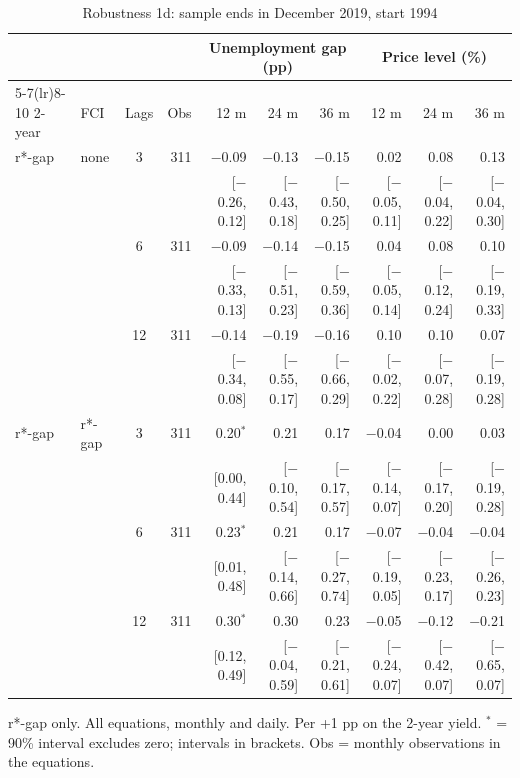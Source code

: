 \begin{table}[p]\centering\footnotesize\setlength{\tabcolsep}{2.2pt}
\caption{Robustness 1d: sample ends in December 2019, start 1994}\label{tab:R1d}
\begin{tabular}{llcrrrrrrr}\toprule
 & & & & \multicolumn{3}{c}{Unemployment gap (pp)} & \multicolumn{3}{c}{Price level (\%)}\\ \cmidrule(lr){5-7}\cmidrule(lr){8-10}
2-year & FCI & Lags & Obs & 12 m & 24 m & 36 m & 12 m & 24 m & 36 m\\ \midrule
r*-gap & none & 3 & 311 & $-$0.09 & $-$0.13 & $-$0.15 & 0.02 & 0.08 & 0.13\\
 & & & & {\scriptsize [$-$0.26, 0.12]} & {\scriptsize [$-$0.43, 0.18]} & {\scriptsize [$-$0.50, 0.25]} & {\scriptsize [$-$0.05, 0.11]} & {\scriptsize [$-$0.04, 0.22]} & {\scriptsize [$-$0.04, 0.30]}\\
 &  & 6 & 311 & $-$0.09 & $-$0.14 & $-$0.15 & 0.04 & 0.08 & 0.10\\
 & & & & {\scriptsize [$-$0.33, 0.13]} & {\scriptsize [$-$0.51, 0.23]} & {\scriptsize [$-$0.59, 0.36]} & {\scriptsize [$-$0.05, 0.14]} & {\scriptsize [$-$0.12, 0.24]} & {\scriptsize [$-$0.19, 0.33]}\\
 &  & 12 & 311 & $-$0.14 & $-$0.19 & $-$0.16 & 0.10 & 0.10 & 0.07\\
 & & & & {\scriptsize [$-$0.34, 0.08]} & {\scriptsize [$-$0.55, 0.17]} & {\scriptsize [$-$0.66, 0.29]} & {\scriptsize [$-$0.02, 0.22]} & {\scriptsize [$-$0.07, 0.28]} & {\scriptsize [$-$0.19, 0.28]}\\
r*-gap & r*-gap & 3 & 311 & 0.20$^{*}$ & 0.21 & 0.17 & $-$0.04 & 0.00 & 0.03\\
 & & & & {\scriptsize [0.00, 0.44]} & {\scriptsize [$-$0.10, 0.54]} & {\scriptsize [$-$0.17, 0.57]} & {\scriptsize [$-$0.14, 0.07]} & {\scriptsize [$-$0.17, 0.20]} & {\scriptsize [$-$0.19, 0.28]}\\
 &  & 6 & 311 & 0.23$^{*}$ & 0.21 & 0.17 & $-$0.07 & $-$0.04 & $-$0.04\\
 & & & & {\scriptsize [0.01, 0.48]} & {\scriptsize [$-$0.14, 0.66]} & {\scriptsize [$-$0.27, 0.74]} & {\scriptsize [$-$0.19, 0.05]} & {\scriptsize [$-$0.23, 0.17]} & {\scriptsize [$-$0.26, 0.23]}\\
 &  & 12 & 311 & 0.30$^{*}$ & 0.30 & 0.23 & $-$0.05 & $-$0.12 & $-$0.21\\
 & & & & {\scriptsize [0.12, 0.49]} & {\scriptsize [$-$0.04, 0.59]} & {\scriptsize [$-$0.21, 0.61]} & {\scriptsize [$-$0.24, 0.07]} & {\scriptsize [$-$0.42, 0.07]} & {\scriptsize [$-$0.65, 0.07]}\\
\bottomrule\end{tabular}
\par\smallskip\parbox{0.96\linewidth}{\scriptsize r*-gap only. All equations, monthly and daily. Per +1 pp on the 2-year yield. $^{*}$ = 90\% interval excludes zero; intervals in brackets. Obs = monthly observations in the equations.}
\end{table}
